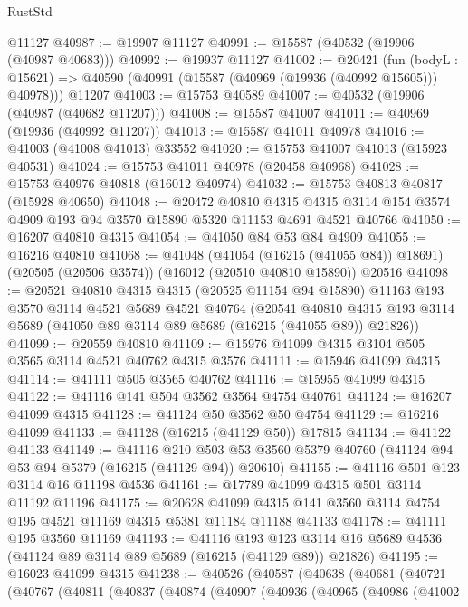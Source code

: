 \begin{lexlean}{RustStd}
\begin{coremodule}
    @11127
@40987 := @19907 @11127
@40991 := @15587 (@40532 (@19906 (@40987 @40683)))
@40992 := @19937 @11127
@41002 := @20421
    (fun (bodyL : @15621) => @40590 (@40991 (@15587 (@40969 (@19936 (@40992 @15605))) @40978)))
    @11207
@41003 := @15753 @40589
@41007 := @40532 (@19906 (@40987 (@40682 @11207)))
@41008 := @15587 @41007
@41011 := @40969 (@19936 (@40992 @11207))
@41013 := @15587 @41011 @40978
@41016 := @41003 (@41008 @41013) @33552
@41020 := @15753 @41007 @41013 (@15923 @40531)
@41024 := @15753 @41011 @40978 (@20458 @40968)
@41028 := @15753 @40976 @40818 (@16012 @40974)
@41032 := @15753 @40813 @40817 (@15928 @40650)
@41048 := @20472
    @40810
    @4315
    @4315
    @3114
    @154
    @3574
    @4909
    @193
    @94
    @3570
    @15890
    @5320
    @11153
    @4691
    @4521
    @40766
@41050 := @16207 @40810 @4315
@41054 := @41050 @84 @53 @84 @4909
@41055 := @16216 @40810
@41068 := @41048
    (@41054 (@16215 (@41055 @84)) @18691)
    (@20505 (@20506 @3574))
    (@16012 (@20510 @40810 @15890))
    @20516
@41098 := @20521
    @40810
    @4315
    @4315
    (@20525 @11154 @94 @15890)
    @11163
    @193
    @3570
    @3114
    @4521
    @5689
    @4521
    @40764
    (@20541 @40810 @4315 @193 @3114 @5689 (@41050 @89 @3114 @89 @5689 (@16215 (@41055 @89)) @21826))
@41099 := @20559 @40810
@41109 := @15976 @41099 @4315 @3104 @505 @3565 @3114 @4521 @40762 @4315 @3576
@41111 := @15946 @41099 @4315
@41114 := @41111 @505 @3565 @40762
@41116 := @15955 @41099 @4315
@41122 := @41116 @141 @504 @3562 @3564 @4754 @40761
@41124 := @16207 @41099 @4315
@41128 := @41124 @50 @3562 @50 @4754
@41129 := @16216 @41099
@41133 := @41128 (@16215 (@41129 @50)) @17815
@41134 := @41122 @41133
@41149 := @41116
    @210
    @503
    @53
    @3560
    @5379
    @40760
    (@41124 @94 @53 @94 @5379 (@16215 (@41129 @94)) @20610)
@41155 := @41116 @501 @123 @3114 @16 @11198 @4536
@41161 := @17789 @41099 @4315 @501 @3114 @11192 @11196
@41175 := @20628
    @41099
    @4315
    @141
    @3560
    @3114
    @4754
    @195
    @4521
    @11169
    @4315
    @5381
    @11184
    @11188
    @41133
@41178 := @41111 @195 @3560 @11169
@41193 := @41116
    @193
    @123
    @3114
    @16
    @5689
    @4536
    (@41124 @89 @3114 @89 @5689 (@16215 (@41129 @89)) @21826)
@41195 := @16023 @41099 @4315
@41238 := @40526
    (@40587
      (@40638
        (@40681
          (@40721
            (@40767
              (@40811
                (@40837
                  (@40874
                    (@40907
                      (@40936
                        (@40965
                          (@40986
                            (@41002

\end{coremodule}
\end{lexlean}
